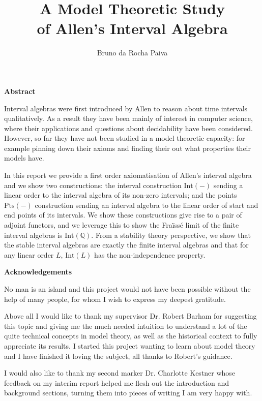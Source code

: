 \documentclass[11pt %
              ]{article}
\title{A Model Theoretic Study \\ of Allen's Interval Algebra}
\author{Bruno da Rocha Paiva}
\date{} %
\newcommand{\Q}{\mathbb{Q}}
\newcommand{\inter}[1][-]{\text{Int}\left(#1\right)}
\newcommand{\points}[1][-]{\text{Pts}\left(#1\right)}
\theoremstyle{plain}
\theoremstyle{definition}
\theoremstyle{remark}
\begin{document}
\pagestyle{empty}



\newpage
\hspace{0pt}
\vfill
\begin{center}
    \textbf{Abstract}
\end{center}
Interval algebras were first introduced by Allen to reason about time intervals qualitatively. As
a result they have been mainly of interest in computer science, where their applications and
questions about decidability have been considered. However, so far they have not been studied in a
model theoretic capacity: for example pinning down their axioms and finding their out what
properties their models have.

In this report we provide a first order axiomatisation of Allen's interval algebra and we show
two constructions: the interval construction $\inter$ sending a linear order to the interval algebra
of its non-zero intervals; and the points $\points$ construction sending an interval algebra to
the linear order of start and end points of its intervals. We show these constructions give rise to
a pair of adjoint functors, and we leverage this to show the Fraïssé limit of the finite interval
algebras is $\inter[\Q]$. From a stability theory perspective, we show that the stable interval
algebras are exactly the finite interval algebras and that for any linear order $L$, $\inter[L]$
has the non-independence property.
\vfill
\hspace{0pt}

\newpage
\hspace{0pt}
\vfill
\begin{center}
    \textbf{Acknowledgements}
\end{center}
No man is an island and this project would not have been possible without the help of many people,
for whom I wish to express my deepest gratitude.

Above all I would like to thank my supervisor Dr. Robert Barham for suggesting this topic and
giving me the much needed intuition to understand a lot of the quite technical concepts in model
theory, as well as the historical context to fully appreciate its results. I started this project
wanting to learn about model theory and I have finished it loving the subject, all thanks to
Robert's guidance.

I would also like to thank my second marker Dr. Charlotte Kestner whose feedback on my interim
report helped me flesh out the introduction and background sections, turning them into pieces of
writing I am very happy with.
\end{document}
